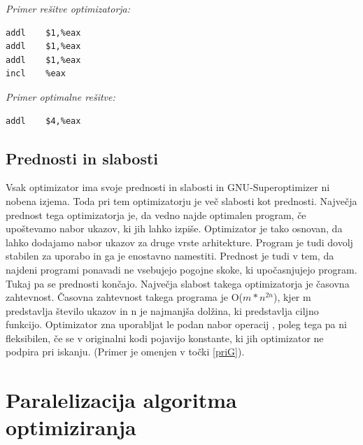 \documentclass[a4paper, 12pt]{book}
\begin{document}
\medskip

\noindent
{\it Primer rešitve optimizatorja:}
\begin{Verbatim}[baselinestretch=1]
addl    $1,%eax
addl    $1,%eax
addl    $1,%eax
incl    %eax
\end{Verbatim}

\medskip

\noindent
{\it Primer optimalne rešitve:}
\begin{Verbatim}[baselinestretch=1]
addl    $4,%eax
\end{Verbatim}
\section{Prednosti in slabosti}
Vsak optimizator ima svoje prednosti in slabosti in GNU-Superoptimizer ni nobena izjema. Toda pri tem optimizatorju je več slabosti kot prednosti. Največja prednost tega optimizatorja je, da vedno najde optimalen program, če upoštevamo nabor ukazov, ki jih lahko izpiše. Optimizator je tako osnovan, da lahko dodajamo nabor ukazov za druge vrste arhitekture. Program je tudi dovolj stabilen za uporabo in ga je enostavno namestiti. Prednost je tudi v tem, da najdeni programi ponavadi ne vsebujejo pogojne skoke, ki upočasnjujejo program. Tukaj pa se prednosti končajo. Največja slabost takega optimizatorja je časovna zahtevnost. Časovna zahtevnost takega programa je O(\(m*n^{2n}\)), kjer m predstavlja število ukazov in n je najmanjša dolžina, ki predstavlja ciljno funkcijo. Optimizator zna uporabljat le podan nabor operacij \cite{pdf5}, poleg tega pa ni fleksibilen, če se v originalni kodi pojavijo konstante, ki jih optimizator ne podpira pri iskanju. (Primer je omenjen v točki \ref{priG}).

\chapter{Paralelizacija algoritma optimiziranja}
\end{document}
